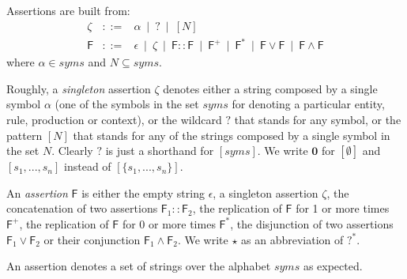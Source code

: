 \begin{definition}
\label{def:assetionl}
Assertions are built from: 
$$
\begin{array}{lcl}
\zeta & ::= & 
\alpha ~\mid ~ 
? ~\mid ~ 
[N]
\\
\mathsf{F} & ::= & 
\epsilon ~\mid ~ 
\zeta ~\mid ~ 
\mathsf{F}::\mathsf{F} ~\mid ~ 
\mathsf{F}^+ ~\mid ~ 
\mathsf{F}^* ~\mid ~ 
\mathsf{F} \vee \mathsf{F} ~\mid ~ 
\mathsf{F} \wedge \mathsf{F}
\end{array}
$$
where $\alpha \in \mathit{syms}$ and $N\subseteq \mathit{syms}$.
\end{definition}

Roughly, a \emph{singleton} assertion $\zeta$ denotes either a string composed by a single symbol $\alpha$ (one of the symbols in the set $\mathit{syms}$ for denoting a particular entity, rule, production or context), or
the wildcard $?$ that stands for any symbol, or the pattern $[N]$ that stands for any of the strings composed by a single symbol in the set $N$. Clearly $?$  is just a shorthand for $[\mathit{syms}]$.
We write $\mathbf{0}$ for $[\emptyset]$ and $[s_1,...,s_n]$ instead of $[\{s_1,...,s_n\}]$. 

An \emph{assertion} $\mathsf{F}$ is either the empty string $\epsilon$, a singleton assertion $\zeta$, the concatenation of two assertions $\mathsf{F}_1::\mathsf{F}_2$, the replication of $\mathsf{F}$ for 1 or more times $\mathsf{F}^+$, the replication of $\mathsf{F}$ for 0 or more times $\mathsf{F}^*$, the disjunction of two assertions $\mathsf{F}_1 \vee \mathsf{F}_2$ or their conjunction $\mathsf{F}_1 \wedge \mathsf{F}_2$. We write $\star$ as an abbreviation of $?^*$.

An assertion denotes a set of strings over the alphabet $\mathit{syms}$ as expected.

